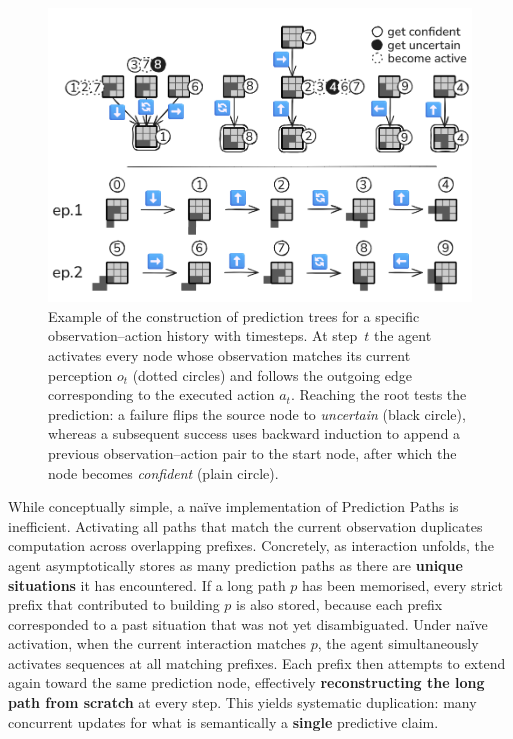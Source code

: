 \documentclass[11pt]{article}
\begin{document}
\begin{figure}[ht]
\centering
\includegraphics[width=\linewidth]{img/prediction_trees.png}
\caption{Example of the construction of prediction trees for a specific observation–action history with timesteps. At step $t$ the agent activates every node whose observation matches its current perception $o_t$ (dotted circles) and follows the outgoing edge corresponding to the executed action $a_t$. Reaching the root tests the prediction: a failure flips the source node to \emph{uncertain} (black circle), whereas a subsequent success uses backward induction to append a previous observation–action pair to the start node, after which the node becomes \emph{confident} (plain circle).}
\label{fig:tree_construction}
\end{figure}

While conceptually simple, a naïve implementation of Prediction Paths is inefficient. Activating all paths that match the current observation duplicates computation across overlapping prefixes. Concretely, as interaction unfolds, the agent asymptotically stores as many prediction paths as there are \textbf{unique situations} it has encountered. If a long path $p$ has been memorised, every strict prefix that contributed to building $p$ is also stored, because each prefix corresponded to a past situation that was not yet disambiguated. Under naïve activation, when the current interaction matches $p$, the agent simultaneously activates sequences at all matching prefixes. Each prefix then attempts to extend again toward the same prediction node, effectively \textbf{reconstructing the long path from scratch} at every step. This yields systematic duplication: many concurrent updates for what is semantically a \textbf{single} predictive claim.
\end{document}
